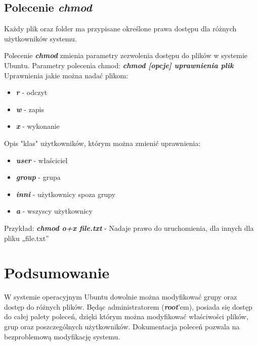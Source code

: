 \documentclass{article}
\begin{document}
\newpage
\subsection{Polecenie \emph{\textbf{chmod}}}
Każdy plik oraz folder ma przypisane określone prawa dostępu dla różnych użytkowników systemu.\par
Polecenie \emph{\textbf{chmod}} zmienia parametry zezwolenia dostępu do plików w systemie Ubuntu.
Parametry polecenia chmod:
\emph{\textbf{chmod [opcje] uprawnienia plik}}\\

Uprawnienia jakie można nadać plikom:
\begin{itemize}
    \item \emph{\textbf{r}} - odczyt
    \item \emph{\textbf{w}} - zapis
    \item \emph{\textbf{x}} - wykonanie
\end{itemize}

Opis "klas" użytkowników, którym można zmienić uprawnienia:
\begin{itemize}
    \item  \emph{\textbf{user}} - właściciel
    \item  \emph{\textbf{group}} - grupa
    \item  \emph{\textbf{inni}} - użytkownicy spoza grupy
    \item  \emph{\textbf{a}} - wszyscy użytkownicy
\end{itemize}
Przykład:
\emph{\textbf{chmod o+x file.txt}} - Nadaje prawo do uruchomienia, dla innych dla pliku „file.txt”




\section{Podsumowanie}
W systemie operacyjnym Ubuntu dowolnie można modyfikować grupy oraz dostęp do różnych
plików. Będąc administratorem (\emph{\textbf{root}}'em), posiada się dostęp do całej palety poleceń, dzięki którym można modyfikować właściwości plików, grup oraz poszczególnych użytkowników.
Dokumentacja poleceń pozwala na bezproblemową modyfikację systemu.
\end{document}
